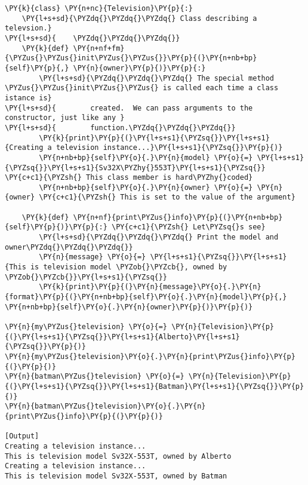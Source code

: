 \begin{Verbatim}[label=\makebox{\url{https://github.com/lucabaldini/cmepda/tree/master/slides/latex/snippets/class\_constructor.py}},commandchars=\\\{\}]
\PY{k}{class} \PY{n+nc}{Television}\PY{p}{:}  
    \PY{l+s+sd}{\PYZdq{}\PYZdq{}\PYZdq{} Class describing a televsion.}
\PY{l+s+sd}{    \PYZdq{}\PYZdq{}\PYZdq{}}
    \PY{k}{def} \PY{n+nf+fm}{\PYZus{}\PYZus{}init\PYZus{}\PYZus{}}\PY{p}{(}\PY{n+nb+bp}{self}\PY{p}{,} \PY{n}{owner}\PY{p}{)}\PY{p}{:}
        \PY{l+s+sd}{\PYZdq{}\PYZdq{}\PYZdq{} The special method \PYZus{}\PYZus{}init\PYZus{}\PYZus{} is called each time a class istance is}
\PY{l+s+sd}{        created.  We can pass arguments to the constructor, just like any }
\PY{l+s+sd}{        function.\PYZdq{}\PYZdq{}\PYZdq{}}
        \PY{k}{print}\PY{p}{(}\PY{l+s+s1}{\PYZsq{}}\PY{l+s+s1}{Creating a television instance...}\PY{l+s+s1}{\PYZsq{}}\PY{p}{)}
        \PY{n+nb+bp}{self}\PY{o}{.}\PY{n}{model} \PY{o}{=} \PY{l+s+s1}{\PYZsq{}}\PY{l+s+s1}{Sv32X\PYZhy{}553T}\PY{l+s+s1}{\PYZsq{}} \PY{c+c1}{\PYZsh{} This class member is hard\PYZhy{}coded}
        \PY{n+nb+bp}{self}\PY{o}{.}\PY{n}{owner} \PY{o}{=} \PY{n}{owner} \PY{c+c1}{\PYZsh{} This is set to the value of the argument}
    
    \PY{k}{def} \PY{n+nf}{print\PYZus{}info}\PY{p}{(}\PY{n+nb+bp}{self}\PY{p}{)}\PY{p}{:} \PY{c+c1}{\PYZsh{} Let\PYZsq{}s see}
        \PY{l+s+sd}{\PYZdq{}\PYZdq{}\PYZdq{} Print the model and owner\PYZdq{}\PYZdq{}\PYZdq{}}
        \PY{n}{message} \PY{o}{=} \PY{l+s+s1}{\PYZsq{}}\PY{l+s+s1}{This is television model \PYZob{}\PYZcb{}, owned by \PYZob{}\PYZcb{}}\PY{l+s+s1}{\PYZsq{}}
        \PY{k}{print}\PY{p}{(}\PY{n}{message}\PY{o}{.}\PY{n}{format}\PY{p}{(}\PY{n+nb+bp}{self}\PY{o}{.}\PY{n}{model}\PY{p}{,} \PY{n+nb+bp}{self}\PY{o}{.}\PY{n}{owner}\PY{p}{)}\PY{p}{)}

\PY{n}{my\PYZus{}television} \PY{o}{=} \PY{n}{Television}\PY{p}{(}\PY{l+s+s1}{\PYZsq{}}\PY{l+s+s1}{Alberto}\PY{l+s+s1}{\PYZsq{}}\PY{p}{)}
\PY{n}{my\PYZus{}television}\PY{o}{.}\PY{n}{print\PYZus{}info}\PY{p}{(}\PY{p}{)}
\PY{n}{batman\PYZus{}television} \PY{o}{=} \PY{n}{Television}\PY{p}{(}\PY{l+s+s1}{\PYZsq{}}\PY{l+s+s1}{Batman}\PY{l+s+s1}{\PYZsq{}}\PY{p}{)}
\PY{n}{batman\PYZus{}television}\PY{o}{.}\PY{n}{print\PYZus{}info}\PY{p}{(}\PY{p}{)}

[Output]
Creating a television instance...
This is television model Sv32X-553T, owned by Alberto
Creating a television instance...
This is television model Sv32X-553T, owned by Batman
\end{Verbatim}